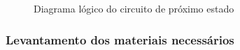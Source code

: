 \documentclass[a4,12pt]{horizon-theme}
\begin{document}
\begin{figure}[!ht]
  \centering
  \caption{Diagrama lógico do circuito de próximo estado}
  \label{fig:diagrama_logico_uc}
\end{figure}


\newpage
\subsubsection{Levantamento dos materiais necessários}
\label{sec:plan_ff_materiais}
\end{document}
